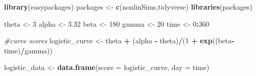 \documentclass[
12pt, %
twoside,
english]{guelphthesis}
\newenvironment{Shaded}{\begin{snugshade}}{\end{snugshade}}
\newcommand{\CommentTok}[1]{\textcolor[rgb]{0.56,0.35,0.01}{\textit{#1}}}
\newcommand{\DecValTok}[1]{\textcolor[rgb]{0.00,0.00,0.81}{#1}}
\newcommand{\FloatTok}[1]{\textcolor[rgb]{0.00,0.00,0.81}{#1}}
\newcommand{\FunctionTok}[1]{\textcolor[rgb]{0.13,0.29,0.53}{\textbf{#1}}}
\newcommand{\NormalTok}[1]{#1}
\newcommand{\OtherTok}[1]{\textcolor[rgb]{0.56,0.35,0.01}{#1}}
\newcommand{\SpecialCharTok}[1]{\textcolor[rgb]{0.81,0.36,0.00}{\textbf{#1}}}
\newcommand{\StringTok}[1]{\textcolor[rgb]{0.31,0.60,0.02}{#1}}
\begin{document}
\begin{Shaded}
\begin{Highlighting}[]
\FunctionTok{library}\NormalTok{(easypackages)}
\NormalTok{packages }\OtherTok{\textless{}{-}} \FunctionTok{c}\NormalTok{(}\StringTok{\textquotesingle{}nonlinSims\textquotesingle{}}\NormalTok{,}\StringTok{\textquotesingle{}tidyverse\textquotesingle{}}\NormalTok{)}
\FunctionTok{libraries}\NormalTok{(packages)}

\NormalTok{theta }\OtherTok{\textless{}{-}} \DecValTok{3}
\NormalTok{alpha }\OtherTok{\textless{}{-}} \FloatTok{3.32}
\NormalTok{beta }\OtherTok{\textless{}{-}} \DecValTok{180}
\NormalTok{gamma }\OtherTok{\textless{}{-}} \DecValTok{20}
\NormalTok{time }\OtherTok{\textless{}{-}} \DecValTok{0}\SpecialCharTok{:}\DecValTok{360}

\CommentTok{\#curve scores}
\NormalTok{logistic\_curve }\OtherTok{\textless{}{-}}\NormalTok{ theta }\SpecialCharTok{+}\NormalTok{ (alpha }\SpecialCharTok{{-}}\NormalTok{ theta)}\SpecialCharTok{/}\NormalTok{(}\DecValTok{1} \SpecialCharTok{+} \FunctionTok{exp}\NormalTok{((beta}\SpecialCharTok{{-}}\NormalTok{time)}\SpecialCharTok{/}\NormalTok{gamma))}

\NormalTok{logistic\_data }\OtherTok{\textless{}{-}} \FunctionTok{data.frame}\NormalTok{(}\StringTok{\textquotesingle{}score\textquotesingle{}} \OtherTok{=}\NormalTok{ logistic\_curve, }
                            \StringTok{\textquotesingle{}day\textquotesingle{}} \OtherTok{=}\NormalTok{ time)}


\end{Highlighting}
\end{Shaded}
\end{document}
